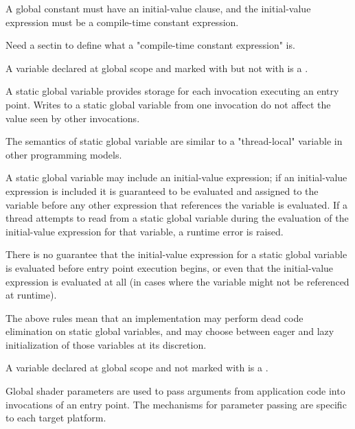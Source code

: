 A global constant must have an initial-value clause, and the initial-value expression must be a compile-time constant expression.

\begin{Incomplete}
Need a sectin to define what a "compile-time constant expression" is.
\end{Incomplete}


A variable declared at global scope and marked with  but not with  is a .

A static global variable provides storage for each invocation executing an entry point.
Writes to a static global variable from one invocation do not affect the value seen by other invocations.

\begin{Note}
The semantics of static global variable are similar to a "thread-local" variable in other programming models.
\end{Note}

A static global variable may include an initial-value expression; if an initial-value expression is included it is guaranteed to be evaluated and assigned to the variable before any other expression that references the variable is evaluated.
If a thread attempts to read from a static global variable during the evaluation of the initial-value expression for that variable, a runtime error is raised.

There is no guarantee that the initial-value expression for a static global variable is evaluated before entry point execution begins, or even that the initial-value expression is evaluated at all (in cases where the variable might not be referenced at runtime).

\begin{Note}
The above rules mean that an implementation may perform dead code elimination on static global variables, and may choose between eager and lazy initialization of those variables at its discretion.
\end{Note}


A variable declared at global scope and not marked with  is a .

Global shader parameters are used to pass arguments from application code into invocations of an entry point.
The mechanisms for parameter passing are specific to each target platform.

